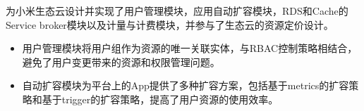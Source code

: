 \documentclass{resume}
\begin{document}


为小米生态云设计并实现了用户管理模块，应用自动扩容模块，RDS和Cache的Service broker模块以及计量与计费模块，并参与了生态云的资源定价设计。
\begin{itemize}
  \item 用户管理模块将用户组作为资源的唯一关联实体，与RBAC控制策略相结合，避免了用户变更带来的资源和权限管理问题。
  \item 自动扩容模块为平台上的App提供了多种扩容方案，包括基于metrics的扩容策略和基于trigger的扩容策略，提高了用户资源的使用效率。
\end{itemize}





\end{document}
